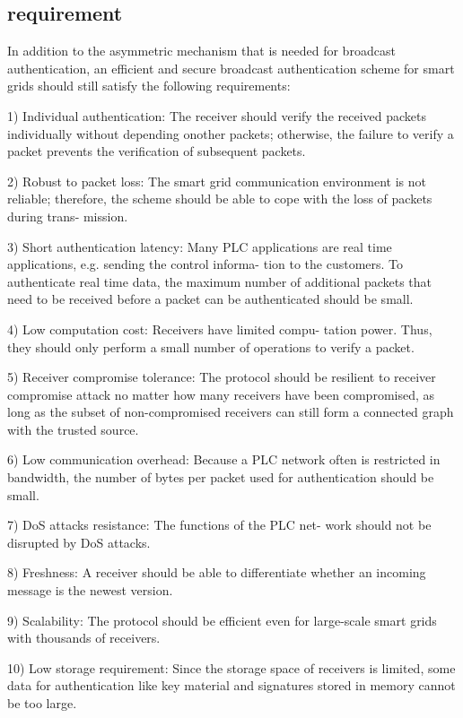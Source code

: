 \documentclass[lnicst,sechang,a4paper]{svmultln}
\begin{document}
\subsection{requirement}

In addition to the asymmetric mechanism that is needed
for broadcast authentication, an efficient and secure broadcast
authentication scheme for smart grids should still satisfy the
following requirements:

1) Individual authentication: The receiver should verify
the received packets individually without depending onother packets; otherwise, the failure to verify a packet
prevents the verification of subsequent packets.

2) Robust to packet loss: The smart grid communication
environment is not reliable; therefore, the scheme should
be able to cope with the loss of packets during trans-
mission.

3) Short authentication latency: Many PLC applications are
real time applications, e.g. sending the control informa-
tion to the customers. To authenticate real time data, the
maximum number of additional packets that need to be
received before a packet can be authenticated should be
small.

4) Low computation cost: Receivers have limited compu-
tation power. Thus, they should only perform a small
number of operations to verify a packet.

5) Receiver compromise tolerance: The protocol should be
resilient to receiver compromise attack no matter how
many receivers have been compromised, as long as the
subset of non-compromised receivers can still form a
connected graph with the trusted source.

6) Low communication overhead: Because a PLC network
often is restricted in bandwidth, the number of bytes per
packet used for authentication should be small.

7) DoS attacks resistance: The functions of the PLC net-
work should not be disrupted by DoS attacks.

8) Freshness: A receiver should be able to differentiate
whether an incoming message is the newest version.

9) Scalability: The protocol should be efficient even for
large-scale smart grids with thousands of receivers.

10) Low storage requirement: Since the storage space of
receivers is limited, some data for authentication like
key material and signatures stored in memory cannot be
too large.
\end{document}
